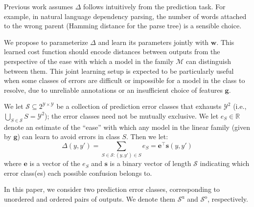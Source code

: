 \documentclass{article} %
\newcommand{\unorderedS}{\mathcal{S}^{\mathrm{u}}}
\newcommand{\orderedS}{\mathcal{S}^{\mathrm{o}}}
\begin{document}
Previous work assumes $\Delta$ follows intuitively from the prediction
task.  For example, in natural language dependency parsing, the number
of words attached to the wrong parent (Hamming distance for the parse
tree) is a sensible choice.  

We propose to parameterize $\Delta$ and
learn its parameters jointly with $\mathbf{w}$.  This learned cost
function should encode distances between outputs from the perspective
of the ease with which a model in the family $\mathcal{M}$
can distinguish between them.
This joint learning setup is expected to be particularly useful when
some classes of errors are difficult or impossible for a model in the
class to resolve, due to unreliable annotations or an insufficient
choice of features $\mathbf{g}$.

We let $\mathcal{S} \subseteq 2^{\mathcal{Y}\times\mathcal{Y}}$ be a
collection of prediction error classes that exhausts $\mathcal{Y}^2$ (i.e., $\bigcup_{S \in
  \mathcal{S}} S = \mathcal{Y}^2$); the error classes need not be
mutually exclusive.  We let $e_{S} \in \mathbb{R}$ denote an estimate
of the ``ease'' with which any model in the linear family (given by
$\mathbf{g}$) can learn to avoid errors in class $S$.  Then we let:
\begin{equation}
\Delta(y, y') = \sum_{S \in \mathcal{S}: (y, y') \in S} e_S =
\mathbf{e}^\top \mathbf{s}(y, y')
\end{equation}
where $\mathbf{e}$ is a vector of the $e_S$ and $\mathbf{s}$ is a
binary vector of length $\mathcal{S}$ indicating which error class(es)
each possible confusion belongs to.

In this paper, we consider two prediction error classes, corresponding
to unordered and ordered pairs of outputs.  We denote them
$\unorderedS$ and $\orderedS$, respectively.


\end{document}
